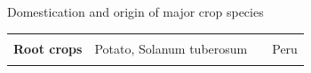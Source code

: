 \documentclass[
  ignorenonframetext,
  aspectratio=169]{beamer}
\begin{document}
\begin{frame}{Domestication and origin of major crop species}
\begin{table}
\begin{tabular}[t]{>{\raggedright\arraybackslash}p{8em}>{\raggedright\arraybackslash}p{12em}>{\raggedright\arraybackslash}p{8em}>{\raggedright\arraybackslash}p{12em}}
\textbf{\cellcolor{gray!6}{Pulses}} & \cellcolor{gray!6}{Peas, Pisum sativum} & \cellcolor{gray!6}{9000} & \cellcolor{gray!6}{Syria, Jordan, Israel, Iraq}\\
\textbf{Root crops} & Potato, Solanum tuberosum & 7000 & Peru\\
\textbf{\cellcolor{gray!6}{Root crops}} & \cellcolor{gray!6}{Cassava, Manihot esculenta} & \cellcolor{gray!6}{5000} & \cellcolor{gray!6}{Brazil, Mexico}\\
\bottomrule
\end{tabular}
\end{table}
\end{frame}

\begin{frame}{}
\protect\hypertarget{section-7}{}
\begin{table}


\end{table}
\end{frame}
\end{document}
